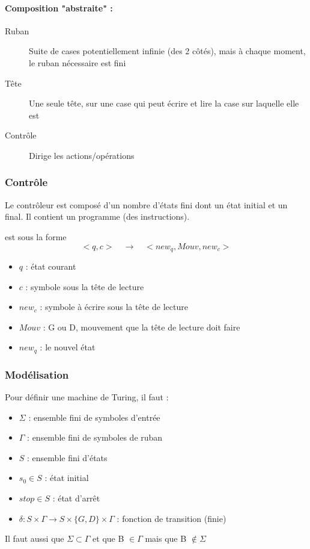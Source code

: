 \paragraph{Composition "abstraite" :}
\begin{description}
	\item[Ruban] Suite de cases potentiellement infinie (des 2 côtés), mais à 
		chaque moment, le ruban nécessaire est fini
	\item[Tête] Une seule tête, sur une case qui peut écrire et lire la 
		case sur laquelle elle est
	\item[Contrôle] Dirige les actions/opérations
\end{description}

\subsubsection{Contrôle}
\label{ssub:contr_le}
Le contrôleur est composé d'un nombre d'états fini dont un état initial et un 
final. Il contient un programme (des instructions).

\begin{mydef} est sous la forme 
	$$<q,c> \quad \rightarrow \quad <new_q, Mouv, new_c>$$
	\begin{itemize}
		\item $q$ : état courant
		\item $c$ : symbole sous la tête de lecture
		\item $new_c$ : symbole à écrire sous la tête de lecture
		\item $Mouv$ : G ou D, mouvement que la tête de lecture doit faire
		\item $new_q$ : le nouvel état
	\end{itemize}
\end{mydef}


\subsubsection{Modélisation}
Pour définir une machine de Turing, il faut :
\begin{itemize}
	\item $\Sigma$ : ensemble fini de symboles d'entrée
	\item $\Gamma$ : ensemble fini de symboles de ruban
	\item $S$ : ensemble fini d'états
	\item $s_0 \in S$ : état initial
	\item $stop \in S$ : état d'arrêt
	\item $\delta : S \times \Gamma \rightarrow S \times \{G,D\} 
	\times \Gamma$ : fonction de transition (finie)
\end{itemize}
Il faut aussi que $\Sigma \subset \Gamma$ et que B $\in \Gamma$ mais que B 
$\notin \Sigma$

